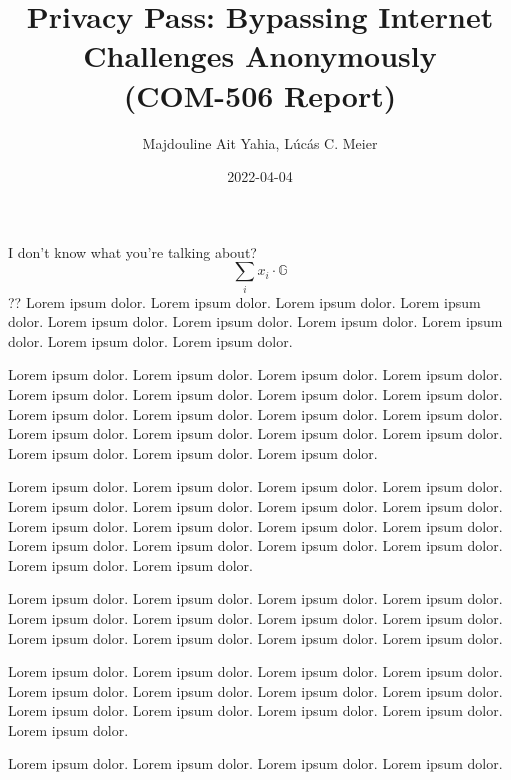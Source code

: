 \documentclass[12pt, a4paper]{article}
\date{2022-04-04}
\title{Privacy Pass: Bypassing Internet Challenges Anonymously\\
\large (COM-506 Report)
}
\author{Majdouline Ait Yahia, Lúcás C. Meier}
\begin{document}
\twocolumn

\maketitle


I don't know what you're talking about?
$$
\sum_i x_i \cdot \mathbb{G}
$$
??
Lorem ipsum dolor.
Lorem ipsum dolor.
Lorem ipsum dolor.
Lorem ipsum dolor.
Lorem ipsum dolor.
Lorem ipsum dolor.
Lorem ipsum dolor.
Lorem ipsum dolor.
Lorem ipsum dolor.
Lorem ipsum dolor.

Lorem ipsum dolor.
Lorem ipsum dolor.
Lorem ipsum dolor.
Lorem ipsum dolor.
Lorem ipsum dolor.
Lorem ipsum dolor.
Lorem ipsum dolor.
Lorem ipsum dolor.
Lorem ipsum dolor.
Lorem ipsum dolor.
Lorem ipsum dolor.
Lorem ipsum dolor.
Lorem ipsum dolor.
Lorem ipsum dolor.
Lorem ipsum dolor.
Lorem ipsum dolor.
Lorem ipsum dolor.
Lorem ipsum dolor.
Lorem ipsum dolor.

Lorem ipsum dolor.
Lorem ipsum dolor.
Lorem ipsum dolor.
Lorem ipsum dolor.
Lorem ipsum dolor.
Lorem ipsum dolor.
Lorem ipsum dolor.
Lorem ipsum dolor.
Lorem ipsum dolor.
Lorem ipsum dolor.
Lorem ipsum dolor.
Lorem ipsum dolor.
Lorem ipsum dolor.
Lorem ipsum dolor.
Lorem ipsum dolor.
Lorem ipsum dolor.
Lorem ipsum dolor.
Lorem ipsum dolor.

Lorem ipsum dolor.
Lorem ipsum dolor.
Lorem ipsum dolor.
Lorem ipsum dolor.
Lorem ipsum dolor.
Lorem ipsum dolor.
Lorem ipsum dolor.
Lorem ipsum dolor.
Lorem ipsum dolor.
Lorem ipsum dolor.
Lorem ipsum dolor.
Lorem ipsum dolor.

Lorem ipsum dolor.
Lorem ipsum dolor.
Lorem ipsum dolor.
Lorem ipsum dolor.
Lorem ipsum dolor.
Lorem ipsum dolor.
Lorem ipsum dolor.
Lorem ipsum dolor.
Lorem ipsum dolor.
Lorem ipsum dolor.
Lorem ipsum dolor.
Lorem ipsum dolor.
Lorem ipsum dolor.

Lorem ipsum dolor.
Lorem ipsum dolor.
Lorem ipsum dolor.
Lorem ipsum dolor.
\end{document}
